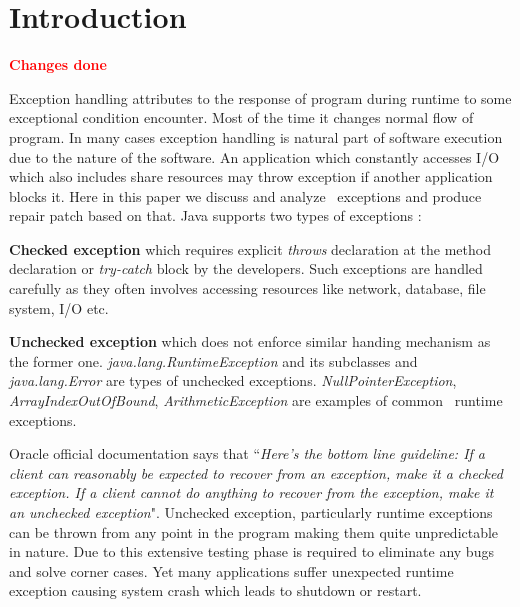 \section{Introduction}
\label{sec:intro}

\textcolor{red}{\textbf{Changes done}}\newline

Exception handling attributes to the response of program during runtime to some
exceptional condition encounter.
Most of the time it changes normal flow of program. In many cases exception
handling is natural part of software execution due to the nature of the
software.
An application which constantly accesses I/O which also includes share resources
may throw exception if another application blocks it.
Here in this paper we discuss and analyze \java\ exceptions and produce repair
patch based on that. Java supports two types of exceptions :
\begin{mylist}
	
\item \textbf{Checked exception} which requires explicit \emph{throws}
declaration at the method declaration or \emph{try-catch} block by the
developers. Such exceptions are handled carefully as they often involves
accessing resources like network, database, file system, I/O etc.
	
\item \textbf{Unchecked exception} which does not enforce similar handing
mechanism as the former one. \emph{java.lang.RuntimeException} and its
subclasses and \emph{java.lang.Error} are types of unchecked exceptions.
\emph{NullPointerException}, \emph{ArrayIndexOutOfBound},
\emph{ArithmeticException} are examples of common \java\ runtime exceptions.

\end{mylist}

Oracle official documentation says that ``\emph{Here's the bottom line
guideline: If a client can reasonably be expected to recover from an exception,
 make it a checked exception. If a client cannot do anything to recover from the
 exception, make it an unchecked exception}".
 Unchecked exception, particularly runtime exceptions can be thrown from any
 point in the program making them quite unpredictable in nature.
 Due to this extensive testing phase is required to eliminate any bugs and solve
 corner cases.
 Yet many applications suffer unexpected runtime exception causing system crash
 which leads to shutdown or restart.


